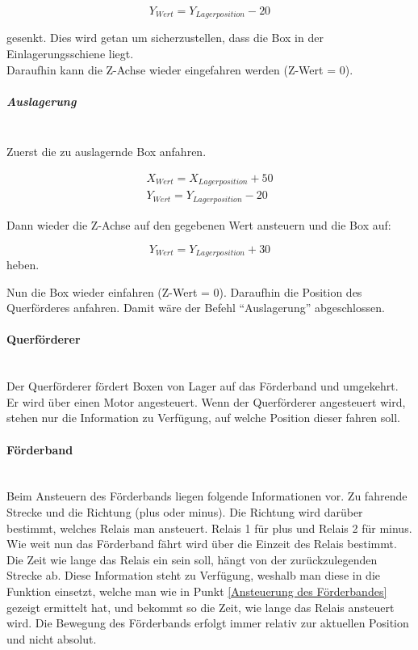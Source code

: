    \vspace{-6mm}
    \begin{equation*}
        Y_{Wert} = Y_{Lagerposition} - 20
    \end{equation*}

    gesenkt. Dies wird getan um sicherzustellen, dass die Box in der Einlagerungsschiene liegt. \\
    Daraufhin kann die Z-Achse wieder eingefahren werden (Z-Wert = 0). 

    \subparagraph{Auslagerung} \mbox{} \\
    Zuerst die zu auslagernde Box anfahren. 

    \vspace{-6mm}

    \begin{equation*}
        \begin{split}
                X_{Wert} = X_{Lagerposition} + 50
                \\
                Y_{Wert} = Y_{Lagerposition} - 20  
        \end{split} 
    \end{equation*}

    Dann wieder die Z-Achse auf den gegebenen Wert ansteuern und die Box auf:

    \vspace{-6mm}
    \begin{equation*}
        Y_{Wert} = Y_{Lagerposition} + 30
    \end{equation*}
    heben.

    Nun die Box wieder einfahren (Z-Wert = 0). Daraufhin die Position des Querförderes anfahren. Damit wäre der Befehl \enquote{Auslagerung} abgeschlossen.


    \paragraph{Querförderer} \mbox{} \\ 
    Der Querförderer fördert Boxen von Lager auf das Förderband und umgekehrt. Er wird über einen Motor angesteuert. Wenn der Querförderer angesteuert wird, stehen nur die Information zu Verfügung, auf welche Position dieser fahren soll.

    \paragraph{Förderband} \mbox{} \\
    Beim Ansteuern des Förderbands liegen folgende Informationen vor. Zu fahrende Strecke und die Richtung (plus oder minus). Die Richtung wird darüber bestimmt, welches Relais man ansteuert. Relais 1 für plus und Relais 2 für minus. Wie weit nun das Förderband fährt wird über die Einzeit des Relais bestimmt. Die Zeit wie lange das Relais ein sein soll, hängt von der zurückzulegenden Strecke ab. Diese Information steht zu Verfügung, weshalb man diese in die Funktion einsetzt, welche man wie in Punkt \ref{Ansteuerung des Förderbandes} gezeigt ermittelt hat, und bekommt so die Zeit, wie lange das Relais ansteuert wird. Die Bewegung des Förderbands erfolgt immer relativ zur aktuellen Position und nicht absolut. 


